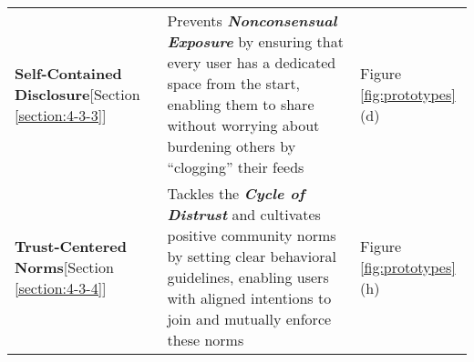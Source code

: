 \begin{table*}[!ht]
\begin{tabular}{p{3.5cm} p{12cm} p{1.5cm}}
\textbf{Self-Contained Disclosure}\newline{}[Section \ref{section:4-3-3}] & Prevents \textbf{\textit{Nonconsensual Exposure}} by ensuring that every user has a dedicated space from the start, enabling them to share without worrying about burdening others by ``clogging'' their feeds & Figure \ref{fig:prototypes}(d) \\

\textbf{Trust-Centered Norms}\newline{}[Section \ref{section:4-3-4}] & Tackles the \textbf{\textit{Cycle of Distrust}} and cultivates positive community norms by setting clear behavioral guidelines, enabling users with aligned intentions to join and mutually enforce these norms & Figure \ref{fig:prototypes}(h) \\

\bottomrule
\end{tabular}
\end{table*}
